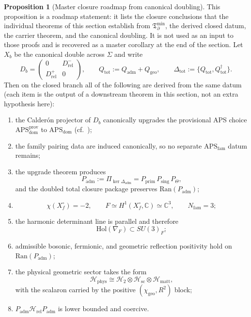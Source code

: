 \documentclass[11pt,a4paper]{article}
\theoremstyle{definition}
\newtheorem{proposition}[theorem]{Proposition}
\theoremstyle{remark}
\newcommand{\Seam}{\Sigma}
\newcommand{\Hrel}{\mathcal H_{\mathrm{rel}}}
\newcommand{\Tbound}{\mathfrak T_{\partial}^{\min}}
\newcommand{\APSdom}{\mathrm{APS}_{\mathrm{dom}}}
\newcommand{\APSfam}{\mathrm{APS}_{\mathrm{fam}}}
\newcommand{\Padm}{P_{\mathrm{adm}}}
\newcommand{\Pprim}{P_{\mathrm{prim}}}
\newcommand{\APSdomprov}{\mathrm{APS}_{\mathrm{dom}}^{\mathrm{prov}}}
\begin{document}
\begin{proposition}[Master closure roadmap from canonical doubling]
\label{thm:master-closure}
\label{prop:master-closure-roadmap}
\label{ass:remaining-closure-inputs}
This proposition is a roadmap statement: it lists the closure conclusions that the individual
theorems of this section establish from $\Tbound$, the derived closed datum, the carrier theorem, and the
canonical doubling. It is not used as an input to those proofs and is recovered as a master
corollary at the end of the section. Let $X_b$ be the canonical double across $\Seam$ and write
\[
D_b=
\begin{pmatrix}
0&D_{\mathrm{rel}}^-\\
D_{\mathrm{rel}}^+&0
\end{pmatrix},
\qquad
Q_{\mathrm{tot}}:=Q_{\mathrm{adm}}+Q_{\mathrm{geo}},
\qquad
\Delta_{\mathrm{tot}}:=\{Q_{\mathrm{tot}},Q_{\mathrm{tot}}^\dagger\}.
\]
Then on the closed branch all of the following are derived from the same datum (each item is the
output of a downstream theorem in this section, not an extra hypothesis here):
\begin{enumerate}[label=(\arabic*), leftmargin=1.5em, topsep=3pt, itemsep=2pt]
    \item the Calder\'on projector of $D_b$ canonically upgrades the provisional APS choice
    $\APSdomprov$ to $\APSdom$ (cf.\ );
    \item the family pairing data are induced canonically, so no separate $\APSfam$ datum remains;
    \item the upgrade theorem  produces
    \[
    \Padm:=\Pi_{\ker \Delta_{\mathrm{adm}}}
    =
    \Pprim\,P_{\mathrm{sing}}\,P_\Theta,
    \]
    and the doubled total closure package preserves $\mathrm{Ran}(\Padm)$;
    \item
    \[
    \chi(X_f^\circ)=-2,
    \qquad
    F\simeq H^1(X_f^\circ,\mathbb C)\simeq \mathbb C^3,
    \qquad
    N_{\mathrm{fam}}=3;
    \]
    \item the harmonic determinant line is parallel and therefore
    \[
    \mathrm{Hol}(\nabla_F)\subset SU(3)_F;
    \]
    \item admissible bosonic, fermionic, and geometric reflection positivity hold on $\mathrm{Ran}(\Padm)$;
    \item the physical geometric sector takes the form
    \[
    \mathcal H_{\mathrm{phys}}
    \cong
    \mathcal H_2\otimes\mathcal H_{\mathrm{sc}}\otimes\mathcal H_{\mathrm{matt}},
    \]
    with the scalaron carried by the positive $(\chi_{\mathrm{geo}},R^2)$ block;
    \item $\Padm\Hrel\Padm$ is lower bounded and coercive.
\end{enumerate}
\end{proposition}
\end{document}
